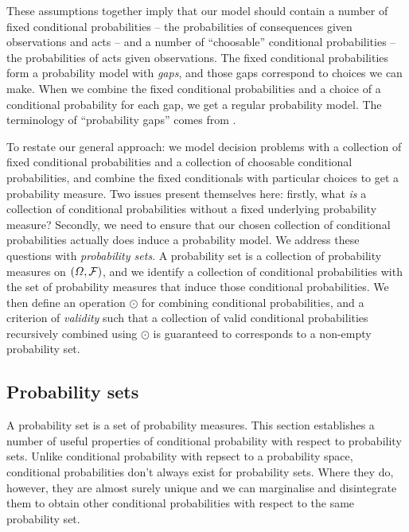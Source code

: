 These assumptions together imply that our model should contain a number of fixed conditional probabilities -- the probabilities of consequences given observations and acts -- and a number of ``choosable'' conditional probabilities -- the probabilities of acts given observations. The fixed conditional probabilities form a probability model with \emph{gaps}, and those gaps correspond to choices we can make. When we combine the fixed conditional probabilities and a choice of a conditional probability for each gap, we get a regular probability model. The terminology of ``probability gaps'' comes from \citet{hajek_what_2003}. 

To restate our general approach: we model decision problems with a collection of fixed conditional probabilities and a collection of choosable conditional probabilities, and combine the fixed conditionals with particular choices to get a probability measure. Two issues present themselves here: firstly, what \emph{is} a collection of conditional probabilities without a fixed underlying probability measure? Secondly, we need to ensure that our chosen collection of conditional probabilities actually does induce a probability model. We address these questions with \emph{probability sets}. A probability set is a collection of probability measures on $(\Omega,\mathcal{F})$, and we identify a collection of conditional probabilities with the set of probability measures that induce those conditional probabilities. We then define an operation $\odot$ for combining conditional probabilities, and a criterion of \emph{validity} such that a collection of valid conditional probabilities recursively combined using $\odot$ is guaranteed to corresponds to a non-empty probability set.


\subsection{Probability sets}

A probability set is a set of probability measures. This section establishes a number of useful properties of conditional probability with respect to probability sets. Unlike conditional probability with repsect to a probability space, conditional probabilities don't always exist for probability sets. Where they do, however, they are almost surely unique and we can marginalise and disintegrate them to obtain other conditional probabilities with respect to the same probability set.

